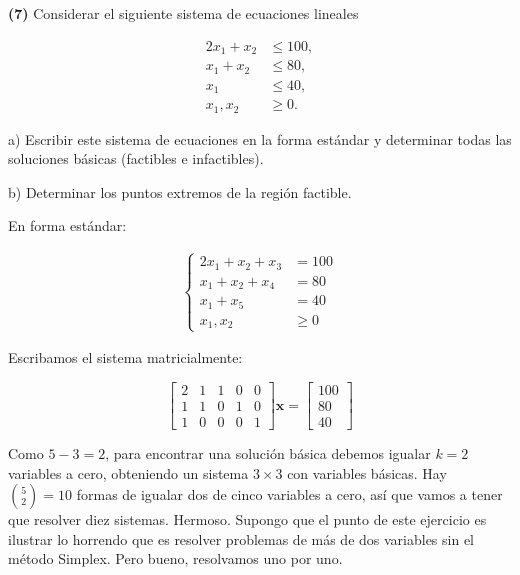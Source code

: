 \documentclass[12pt]{article}
\begin{document}
\begin{myframe}
    \textbf{(7)} Considerar el siguiente sistema de ecuaciones lineales

\[
\begin{aligned}
2x_1+x_2 &\le 100,\\
x_1+x_2 &\le 80,\\
x_1 &\le 40,\\
x_1,x_2 &\ge 0.
\end{aligned}
\]

a) Escribir este sistema de ecuaciones en la forma estándar y determinar todas las soluciones básicas (factibles e infactibles).

b) Determinar los puntos extremos de la región factible.
\end{myframe}

En forma estándar:

\begin{align*}
    \begin{cases}
        2x_1 + x_2 + x_3 &= 100 \\ 
        x_1 + x_2 + x_4 &= 80 \\ 
        x_1 + x_5 &= 40 \\ 
        x_1, x_2 &\geq 0
    \end{cases}
\end{align*}

Escribamos el sistema matricialmente: 

\begin{equation*}
    \begin{bmatrix} 
        2 & 1 & 1 & 0 & 0 \\ 
        1 & 1 & 0 & 1 & 0 \\ 
        1 & 0 & 0 & 0 & 1 
    \end{bmatrix} \textbf{x} = \begin{bmatrix} 
            100 \\ 80 \\ 40 
    \end{bmatrix} 
\end{equation*}

Como $5 - 3 = 2$, para encontrar una solución básica debemos igualar $k = 2$
variables a cero, obteniendo un sistema $3 \times 3$ con variables básicas. Hay 
$\binom{5}{2} = 10$ formas de igualar dos de cinco variables a cero, así que
vamos a tener que resolver diez sistemas. Hermoso. Supongo que el punto de este
ejercicio es ilustrar lo horrendo que es resolver problemas de más de dos
variables sin el método Simplex. Pero bueno, resolvamos uno por uno. 
\end{document}
